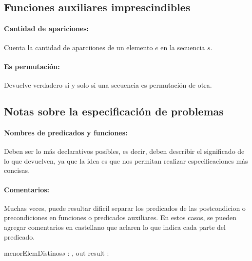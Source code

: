 \subsection{Funciones auxiliares imprescindibles}
\paragraph{Cantidad de apariciones:}
Cuenta la cantidad de aparciiones de un elemento $e$ en la secuencia $s$.


\paragraph{Es permutación:} Devuelve verdadero si y solo si una secuencia es permutación de otra.


\subsection{Notas sobre la especificación de problemas}
\paragraph{Nombres de predicados y funciones:} Deben ser lo más declarativos posibles, es decir, deben describir el significado de lo que devuelven, ya que la idea es que nos permitan realizar especificaciones más concisas.

\paragraph{Comentarios:} Muchas veces, puede resultar dificil separar los predicados de las postcondicion o precondiciones en funciones o predicados auxiliares. En estos casos, se pueden agregar comentarios en castellano que aclaren lo que indica cada parte del predicado.

\begin{center}
	\begin{minipage}[]{0.8\textwidth}
		\begin{proc}{menorElemDistinos}{\In $s$ : \TLista{\ent}, out result : \ent}{}
		\end{proc}
	\end{minipage}
\end{center}

